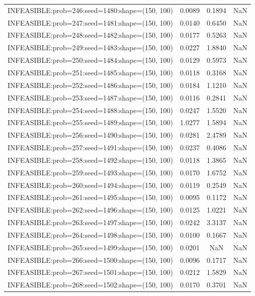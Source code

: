 \begin{longtable}{lccc}
INFEASIBLE:prob=246:seed=1480:shape=(150, 100) & 0.0089 &  0.1894 &    NaN \\
INFEASIBLE:prob=247:seed=1481:shape=(150, 100) & 0.0140 &  0.6450 &    NaN \\
INFEASIBLE:prob=248:seed=1482:shape=(150, 100) & 0.0177 &  0.5263 &    NaN \\
INFEASIBLE:prob=249:seed=1483:shape=(150, 100) & 0.0227 &  1.8840 &    NaN \\
INFEASIBLE:prob=250:seed=1484:shape=(150, 100) & 0.0129 &  0.5973 &    NaN \\
INFEASIBLE:prob=251:seed=1485:shape=(150, 100) & 0.0118 &  0.3168 &    NaN \\
INFEASIBLE:prob=252:seed=1486:shape=(150, 100) & 0.0184 &  1.1210 &    NaN \\
INFEASIBLE:prob=253:seed=1487:shape=(150, 100) & 0.0116 &  0.2841 &    NaN \\
INFEASIBLE:prob=254:seed=1488:shape=(150, 100) & 0.0247 &  1.5520 &    NaN \\
INFEASIBLE:prob=255:seed=1489:shape=(150, 100) & 1.0277 &  1.5894 &    NaN \\
INFEASIBLE:prob=256:seed=1490:shape=(150, 100) & 0.0281 &  2.4789 &    NaN \\
INFEASIBLE:prob=257:seed=1491:shape=(150, 100) & 0.0237 &  0.4086 &    NaN \\
INFEASIBLE:prob=258:seed=1492:shape=(150, 100) & 0.0118 &  1.3865 &    NaN \\
INFEASIBLE:prob=259:seed=1493:shape=(150, 100) & 0.0170 &  1.6752 &    NaN \\
INFEASIBLE:prob=260:seed=1494:shape=(150, 100) & 0.0119 &  0.2549 &    NaN \\
INFEASIBLE:prob=261:seed=1495:shape=(150, 100) & 0.0095 &  0.1172 &    NaN \\
INFEASIBLE:prob=262:seed=1496:shape=(150, 100) & 0.0125 &  1.0221 &    NaN \\
INFEASIBLE:prob=263:seed=1497:shape=(150, 100) & 0.0242 &  3.3137 &    NaN \\
INFEASIBLE:prob=264:seed=1498:shape=(150, 100) & 0.0100 &  0.1667 &    NaN \\
INFEASIBLE:prob=265:seed=1499:shape=(150, 100) & 0.0201 &     NaN &    NaN \\
INFEASIBLE:prob=266:seed=1500:shape=(150, 100) & 0.0096 &  0.1717 &    NaN \\
INFEASIBLE:prob=267:seed=1501:shape=(150, 100) & 0.0212 &  1.5829 &    NaN \\
INFEASIBLE:prob=268:seed=1502:shape=(150, 100) & 0.0170 &  0.3701 &    NaN \\

\end{longtable}

